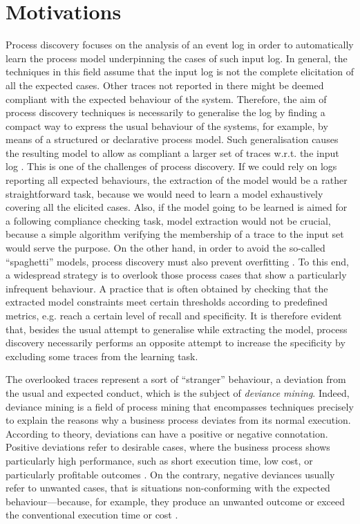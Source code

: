 
\section{Motivations}
\label{sec:motivations}
Process discovery focuses on the analysis of an event log in order to automatically learn the process model underpinning the cases of such input log. 
In general, the techniques in this field assume that the input log is not the complete elicitation of all the expected cases. Other traces not reported in there might be deemed compliant with the expected behaviour of the system. Therefore, the aim of process discovery techniques is necessarily to generalise the log by finding a compact way to express the usual behaviour of the systems, for example, by means of a structured or declarative process model. 
Such generalisation causes the resulting model to allow as compliant a larger set of traces w.r.t. the input log \cite{2011-Aalst}. This is one of the challenges of process discovery. If we could rely on logs reporting all expected behaviours, the extraction of the model would be a rather straightforward task, because we would need to learn a model exhaustively covering all the elicited cases. Also, if the model going to be learned is aimed for a following compliance checking task, model extraction would not be crucial, because a simple algorithm verifying the membership of a trace to the input set would serve the purpose.
On the other hand, in order to avoid the so-called ``spaghetti'' models, process discovery must also prevent overfitting \cite{2010-Aalst}. To this end, a widespread strategy is to overlook those process cases that show a particularly infrequent behaviour. A practice that is often obtained by checking that the extracted model constraints meet certain thresholds according to predefined metrics, e.g. reach a certain level of recall and specificity. 
It is therefore evident that, besides the usual attempt to generalise while extracting the model, process discovery necessarily performs an opposite attempt to increase the specificity by excluding some traces from the learning task.

The overlooked traces represent a sort of ``stranger'' behaviour, a deviation from the usual and expected conduct, which is the subject of \emph{deviance mining}. 
%
Indeed, deviance mining is a field of process mining that encompasses techniques precisely to explain the reasons why a business process deviates from its normal execution. 
According to theory, deviations can have a positive or negative connotation. Positive deviations refer to desirable cases, where the business process shows particularly high performance, such as short execution time, low  cost, or particularly profitable outcomes \cite{2004-Spreitzer}. On the contrary, negative deviances usually refer to unwanted cases, that is situations non-conforming with the expected behaviour---because, for example, they produce an unwanted outcome or exceed the conventional execution time or cost \cite{2016-Nguyen}.
 
